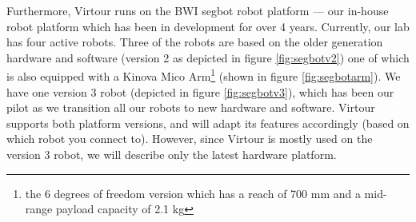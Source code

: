 \documentclass[
  oneside,
  11pt, a4paper,
  footinclude=true,
  headinclude=true,
  cleardoublepage=empty
]{article}
\begin{document}
Furthermore, Virtour runs on the BWI segbot robot platform --- our in-house robot
platform which has been in development for over 4 years. Currently, our lab has
four active robots. Three of the robots are based on the older generation
hardware and software (version 2 as depicted in figure \ref{fig:segbotv2}) one
of which is also equipped with a Kinova Mico Arm\footnote{the 6 degrees of
freedom version which has a reach of 700 mm and a mid-range payload capacity of
2.1 kg} (shown in figure \ref{fig:segbotarm}).  We have one version 3 robot
(depicted in figure \ref{fig:segbotv3}), which has been our pilot as we
transition all our robots to new hardware and software.  Virtour supports both
platform versions, and will adapt its features accordingly (based on which
robot you connect to). However, since Virtour is mostly used on the version 3
robot, we will describe only the latest hardware platform.
\end{document}
